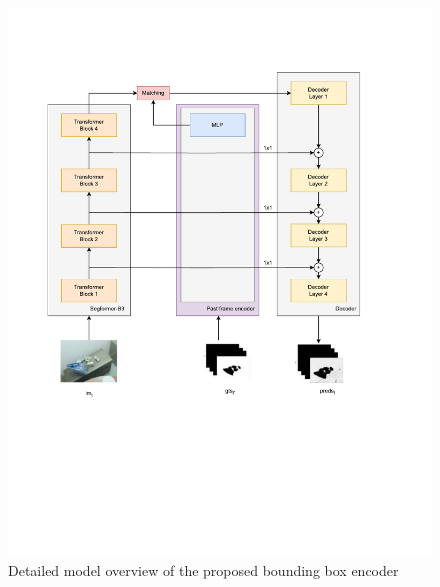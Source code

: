 \begin{figure}
    \centering
    \includegraphics[width=1.\linewidth, trim={ 0.5cm 5cm 3cm 2cm}]{figures/03_method/model_detailed_bbox.pdf}
    \caption{Detailed model overview of the proposed bounding box encoder}
    \label{fig:detailed_model_bbox}
\end{figure}

